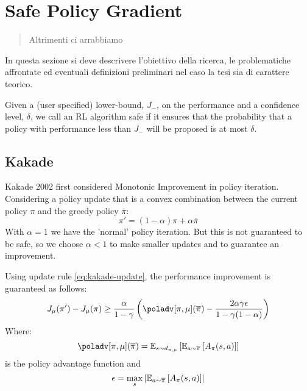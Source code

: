 \chapter{Safe Policy Gradient}
\label{ch:safepg}
\thispagestyle{empty}

\begin{quotation}
{\footnotesize
{}
\begin{flushright}
Altrimenti ci arrabbiamo
\end{flushright}
}
\end{quotation}
\vspace{0.5cm}

\noindent In questa sezione si deve descrivere l'obiettivo della ricerca, le problematiche affrontate ed eventuali definizioni preliminari nel caso la tesi sia di carattere teorico.


\begin{definition}
Given a (user specified) lower-bound, $J_{-}$, on the performance and a confidence level, $\delta$, we call an RL algorithm safe if it ensures that the probability that a policy with performance less than $J_{-}$ will be proposed is at most $\delta$.
 
\end{definition}

\section{Kakade}

Kakade 2002 first considered Monotonic Improvement in policy iteration. Considering a policy update that is a convex combination between the current policy $\pi$ and the greedy policy $\overline{\pi}$:
\begin{equation}
\pi' = (1-\alpha )\pi + \alpha\overline{\pi} \label{eq:kakade-update}
\end{equation}
With $\alpha = 1$ we have the 'normal' policy iteration. But this is not guaranteed to be safe, so we choose $\alpha < 1$ to make smaller updates and to guarantee an improvement.

\begin{theorem}[Kakade 2002]
Using update rule \ref{eq:kakade-update}, the performance improvement is guaranteed as follows:
\begin{equation}
J_{\mu}(\pi') - J_{\mu}(\pi) \geq \frac{\alpha}{1 - \gamma}\left( \poladv[\pi, \mu](\overline{\pi}) - \frac{2\alpha \gamma \epsilon}{1 - \gamma (1 - \alpha)} \right) \label{eq:kakade-improvement}
\end{equation}
Where:
\begin{equation}
\poladv[\pi, \mu](\overline{\pi}) = \EV[s\sim d_{\pi, \mu}]{ \EV[a\sim\overline{\pi}]{A_{\pi}(s,a)}}
\end{equation}
is the policy advantage function and
\begin{equation}
\epsilon = \max_s \left| \EV[a\sim\overline{\pi}]{A_{\pi}(s,a)} \right|
\end{equation}
\end{theorem}

